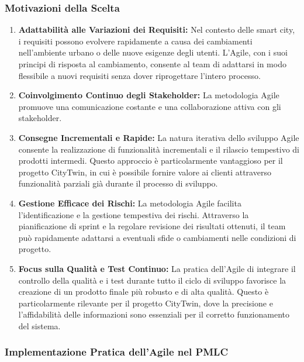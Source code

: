 \subsubsection{Motivazioni della Scelta}

\begin{enumerate}
    \item \textbf{Adattabilità alle Variazioni dei Requisiti:} Nel contesto delle smart city, i requisiti possono evolvere rapidamente a causa dei cambiamenti nell'ambiente urbano o delle nuove esigenze degli utenti. L'Agile, con i suoi principi di risposta al cambiamento, consente al team di adattarsi in modo flessibile a nuovi requisiti senza dover riprogettare l'intero processo.

    \item \textbf{Coinvolgimento Continuo degli Stakeholder:} La metodologia Agile promuove una comunicazione costante e una collaborazione attiva con gli stakeholder.

    \item \textbf{Consegne Incrementali e Rapide:} La natura iterativa dello sviluppo Agile consente la realizzazione di funzionalità incrementali e il rilascio tempestivo di prodotti intermedi. Questo approccio è particolarmente vantaggioso per il progetto CityTwin, in cui è possibile fornire valore ai clienti attraverso funzionalità parziali già durante il processo di sviluppo.

    \item \textbf{Gestione Efficace dei Rischi:} La metodologia Agile facilita l'identificazione e la gestione tempestiva dei rischi. Attraverso la pianificazione di sprint e la regolare revisione dei risultati ottenuti, il team può rapidamente adattarsi a eventuali sfide o cambiamenti nelle condizioni di progetto.

    \item \textbf{Focus sulla Qualità e Test Continuo:} La pratica dell'Agile di integrare il controllo della qualità e i test durante tutto il ciclo di sviluppo favorisce la creazione di un prodotto finale più robusto e di alta qualità. Questo è particolarmente rilevante per il progetto CityTwin, dove la precisione e l'affidabilità delle informazioni sono essenziali per il corretto funzionamento del sistema.
\end{enumerate}

\subsubsection{Implementazione Pratica dell'Agile nel PMLC}


